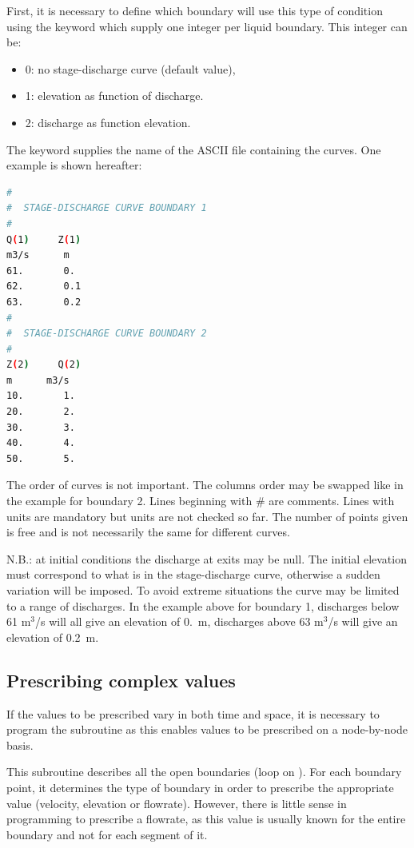 First, it is necessary to define which boundary will use this type of condition
using the keyword  which supply one integer per
liquid boundary.
This integer can be:

\begin{itemize}
\item 0: no stage-discharge curve (default value),

\item 1: elevation as function of discharge.

\item 2: discharge as function elevation.
\end{itemize}

The keyword  supplies the name of the ASCII
file containing the curves.
One example is shown hereafter:
\begin{lstlisting}[language=bash]
#
#  STAGE-DISCHARGE CURVE BOUNDARY 1
#
Q(1)     Z(1)
m3/s      m
61.       0.
62.       0.1
63.       0.2
#
#  STAGE-DISCHARGE CURVE BOUNDARY 2
#
Z(2)     Q(2)
m      m3/s
10.       1.
20.       2.
30.       3.
40.       4.
50.       5.
\end{lstlisting}
The order of curves is not important.
The columns order may be swapped like in the example for boundary 2.
Lines beginning with \# are comments.
Lines with units are mandatory but units are not checked so far.
The number of points given is free and is not necessarily the same for different
curves.

N.B.: at initial conditions the discharge at exits may be null.
The initial elevation must correspond to what is in the stage-discharge curve,
otherwise a sudden variation will be imposed.
To avoid extreme situations the curve may be limited to a range of discharges.
In the example above for boundary 1, discharges below 61 m$^3$/s will all give
an elevation of 0.~m, discharges above 63 m$^3$/s will give an elevation of
0.2~m.


\subsection{Prescribing complex values}
\label{subs:pres:compl:val}
If the values to be prescribed vary in both time and space, it is necessary
to program the  subroutine as this enables values
to be prescribed on a node-by-node basis.

This subroutine describes all the open boundaries (loop on ).
For each boundary point, it determines the type of boundary in order
to prescribe the appropriate value (velocity, elevation or flowrate).
However, there is little sense in programming  to prescribe
a flowrate, as this value is usually known for the entire boundary and not for
each segment of it.

